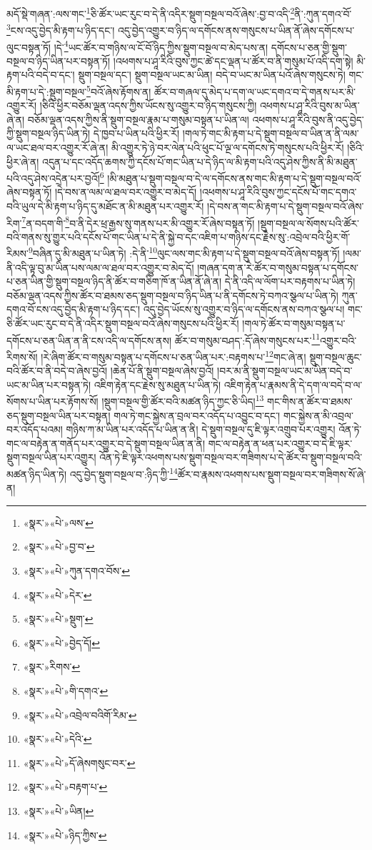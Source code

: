 མདོ་སྡེ་གཞན་:ལས་གང་\footnote{«སྣར་»«པེ་»ལས་}ཅི་ཚོར་ཡང་རུང་བ་དེ་ནི་འདིར་སྡུག་བསྔལ་བའོ་ཞེས་:བྱ་བ་འདི་\footnote{«སྣར་»«པེ་»བྱ་བ་}ནི་:ཀུན་དགའ་བོ་\footnote{«སྣར་»«པེ་»ཀུན་དགའ་བོས་}ངས་འདུ་བྱེད་མི་རྟག་པ་ཉིད་དང་། འདུ་བྱེད་འགྱུར་བ་ཉིད་ལ་དགོངས་ནས་གསུངས་པ་ཡིན་ནོ་ཞེས་དགོངས་པ་ལུང་བསྟན་ཏོ། །དེ་\footnote{«སྣར་»«པེ་»དེར་}ཡང་ཚོར་བ་གཉིས་ལ་ངོ་བོ་ཉིད་ཀྱིས་སྡུག་བསྔལ་བ་མེད་པས་ན། དགོངས་པ་ཅན་གྱི་སྡུག་བསྔལ་བ་ཉིད་ཡིན་པར་བསྟན་ཏོ། །འཕགས་པ་ཤཱ་རིའི་བུས་ཀྱང་ཚེ་དང་ལྡན་པ་ཚོར་བ་ནི་གསུམ་པོ་འདི་དག་སྟེ། མི་རྟག་པའི་བདེ་བ་དང་། སྡུག་བསྔལ་དང་། སྡུག་བསྔལ་ཡང་མ་ཡིན། བདེ་བ་ཡང་མ་ཡིན་པའོ་ཞེས་གསུངས་ཏེ། གང་མི་རྟག་པ་དེ་:སྡུག་བསྔལ་\footnote{«སྣར་»«པེ་»སྡུག་}བའོ་ཞེས་རྟོགས་ན། ཚོར་བ་གཞལ་དུ་མེད་པ་དག་ལ་ཡང་དགའ་བ་དེ་གནས་པར་མི་འགྱུར་རོ། །ཅིའི་ཕྱིར་བཅོམ་ལྡན་འདས་ཀྱིས་ཡོངས་སུ་འགྱུར་བ་ཉིད་གསུངས་ཀྱི། འཕགས་པ་ཤཱ་རིའི་བུས་མ་ཡིན་ཞེ་ན། བཅོམ་ལྡན་འདས་ཀྱིས་ནི་སྡུག་བསྔལ་རྣམ་པ་གསུམ་བསྟན་པ་ཡིན་ལ། འཕགས་པ་ཤཱ་རིའི་བུས་ནི་འདུ་བྱེད་ཀྱི་སྡུག་བསྔལ་ཉིད་ཡིན་ཏེ། དེ་ཁྱབ་པ་ཡིན་པའི་ཕྱིར་རོ། །གལ་ཏེ་གང་མི་རྟག་པ་དེ་སྡུག་བསྔལ་བ་ཡིན་ན་ནི་ལམ་ལ་ཡང་ཐལ་བར་འགྱུར་རོ་ཞེ་ན། མི་འགྱུར་ཏེ་ཉེ་བར་ལེན་པའི་ཕུང་པོ་ལྔ་ལ་དགོངས་ཏེ་གསུངས་པའི་ཕྱིར་རོ། །ཅིའི་ཕྱིར་ཞེ་ན། འདུན་པ་དང་འདོད་ཆགས་ཀྱི་དངོས་པོ་གང་ཡིན་པ་དེ་ཉིད་ལ་མི་རྟག་པའི་འདུ་ཤེས་ཀྱིས་ནི་མི་མཐུན་པའི་འདུ་ཤེས་འདྲེན་པར་བྱའོ།\footnote{«སྣར་»«པེ་»བྱེད་དོ།} །མི་མཐུན་པ་སྡུག་བསྔལ་བ་དེ་ལ་དགོངས་ནས་གང་མི་རྟག་པ་དེ་སྡུག་བསྔལ་བའོ་ཞེས་བསྟན་ཏོ། །དེ་བས་ན་ལམ་ལ་ཐལ་བར་འགྱུར་བ་མེད་དོ། །འཕགས་པ་ཤཱ་རིའི་བུས་ཀྱང་དངོས་པོ་གང་དགའ་བའི་ཡུལ་དེ་མི་རྟག་པ་ཉིད་དུ་མཐོང་ན་མི་མཐུན་པར་འགྱུར་རོ། །དེ་བས་ན་གང་མི་རྟག་པ་དེ་སྡུག་བསྔལ་བའོ་ཞེས་རིག་\footnote{«སྣར་»རིགས་}ན་བདག་གི་\footnote{«སྣར་»«པེ་»གི་དགའ་}བ་ནི་དེར་ཕྲ་རྒྱས་སུ་གནས་པར་མི་འགྱུར་རོ་ཞེས་བསྟན་ཏོ། །སྡུག་བསྔལ་ལ་སོགས་པའི་ཚོར་བའི་གནས་སུ་གྱུར་པའི་དངོས་པོ་གང་ཡིན་པ་དེ་ནི་སྐྱེ་བ་དང་འཇིག་པ་གཉིས་དང་རྗེས་སུ་:འབྲེལ་བའི་ཕྱིར་གོ་རིམས་\footnote{«སྣར་»«པེ་»འབྲེལ་བའིགོ་རིམ་}བཞིན་དུ་མི་མཐུན་པ་ཡིན་ཏེ། :དེ་ནི་\footnote{«སྣར་»«པེ་»དེའི་}ལུང་ལས་གང་མི་རྟག་པ་དེ་སྡུག་བསྔལ་བའོ་ཞེས་བསྟན་ཏོ། །ལམ་ནི་འདི་ལྟ་བུ་མ་ཡིན་པས་ལམ་ལ་ཐལ་བར་འགྱུར་བ་མེད་དོ། །གཞན་དག་ན་རེ་ཚོར་བ་གསུམ་བསྟན་པ་དགོངས་པ་ཅན་ཡིན་གྱི་སྡུག་བསྔལ་ཉིད་ནི་ཚོར་བ་གཅིག་ཁོ་ན་ཡིན་ནོ་ཞེ་ན། དེ་ནི་འདི་ལ་ལོག་པར་བརྟགས་པ་ཡིན་ཏེ། བཅོམ་ལྡན་འདས་ཀྱིས་ཚོར་བ་ཐམས་ཅད་སྡུག་བསྔལ་བ་ཉིད་ཡིན་པ་ནི་དགོངས་ཏེ་བཀའ་སྩལ་པ་ཡིན་ཏེ། ཀུན་དགའ་བོ་ངས་འདུ་བྱེད་མི་རྟག་པ་ཉིད་དང་། འདུ་བྱེད་ཡོངས་སུ་འགྱུར་བ་ཉིད་ལ་དགོངས་ནས་བཀའ་སྩལ་པ། གང་ཅི་ཚོར་ཡང་རུང་བ་དེ་ནི་འདིར་སྡུག་བསྔལ་བའོ་ཞེས་གསུངས་པའི་ཕྱིར་རོ། །གལ་ཏེ་ཚོར་བ་གསུམ་བསྟན་པ་དགོངས་པ་ཅན་ཡིན་ན་ནི་ངས་འདི་ལ་དགོངས་ནས། ཚོར་བ་གསུམ་བཤད་:དོ་ཞེས་གསུངས་པར་\footnote{«སྣར་»«པེ་»དོ་ཞེསགསུང་བར་}འགྱུར་བའི་རིགས་སོ། །རེ་ཞིག་ཚོར་བ་གསུམ་བསྟན་པ་དགོངས་པ་ཅན་ཡིན་པར་:བརྟགས་པ་\footnote{«སྣར་»«པེ་»བརྟག་པ་}གང་ཞེ་ན། སྡུག་བསྔལ་ཆུང་བའི་ཚོར་བ་ནི་བདེ་བ་ཞེས་བྱའོ། །ཆེན་པོ་ནི་སྡུག་བསྔལ་ཞེས་བྱའོ། །བར་མ་ནི་སྡུག་བསྔལ་ཡང་མ་ཡིན་བདེ་བ་ཡང་མ་ཡིན་པར་བསྟན་ཏེ། འཇིག་རྟེན་དང་རྗེས་སུ་མཐུན་པ་ཡིན་ཏེ། འཇིག་རྟེན་པ་རྣམས་ནི་དེ་དག་ལ་བདེ་བ་ལ་སོགས་པ་ཡིན་པར་རྟོགས་སོ། །སྡུག་བསྔལ་གྱི་ཚོར་བའི་མཚན་ཉིད་ཀྱང་ཅི་ཡིད།\footnote{«སྣར་»«པེ་»ཡིན།} གང་གིས་ན་ཚོར་བ་ཐམས་ཅད་སྡུག་བསྔལ་ཡིན་པར་བསྟན། གལ་ཏེ་གང་སྐྱེས་ན་བྲལ་བར་འདོད་པ་འབྱུང་བ་དང་། གང་སྐྱེས་ན་མི་འབྲལ་བར་འདོད་པའམ། གཉིས་ཀ་མ་ཡིན་པར་འདོད་པ་ཡིན་ན་ནི། དེ་སྡུག་བསྔལ་དུ་ཇི་ལྟར་འགྲུབ་པར་འགྱུར། འོན་ཏེ་གང་ལ་བརྟེན་ན་གནོད་པར་འགྱུར་བ་དེ་སྡུག་བསྔལ་ཡིན་ན་ནི། གང་ལ་བརྟེན་ན་ཕན་པར་འགྱུར་བ་དེ་ཇི་ལྟར་སྡུག་བསྔལ་ཡིན་པར་འགྱུར། འོན་ཏེ་ཇི་ལྟར་འཕགས་པས་སྡུག་བསྔལ་བར་གཟིགས་པ་དེ་ཚོར་བ་སྡུག་བསྔལ་བའི་མཚན་ཉིད་ཡིན་ཏེ། འདུ་བྱེད་སྡུག་བསྔལ་བ་:ཉིད་ཀྱི་\footnote{«སྣར་»«པེ་»ཉིད་ཀྱིས་}ཚོར་བ་རྣམས་འཕགས་པས་སྡུག་བསྔལ་བར་གཟིགས་སོ་ཞེ་ན། 